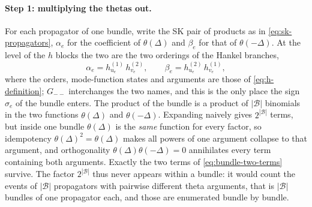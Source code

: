 \documentclass[11pt,a4paper]{article}
\newcommand{\cB}{\mathcal B}
\begin{document}
\paragraph{Step 1: multiplying the thetas out.}
For each propagator of one bundle, write the SK pair of products as in \eqref{eq:sk-propagators},
$\alpha_e$ for the coefficient of $\theta(\Delta)$ and $\beta_e$ for that of $\theta(-\Delta)$. At
the level of the $h$ blocks the two are the two orderings of the Hankel branches,
\begin{equation}
  \alpha_e = h^{(1)}_{u_e}\,h^{(2)}_{v_e},
  \qquad
  \beta_e = h^{(2)}_{u_e}\,h^{(1)}_{v_e},
  \label{eq:bundle-alphabeta}
\end{equation}
where the orders, mode-function states and arguments are those of \eqref{eq:h-definition}; $G_{--}$ interchanges
the two names, and this is the only place the sign $\sigma_e$ of the bundle enters. The product of
the bundle is a product of $|\cB|$ binomials in the two functions $\theta(\Delta)$ and
$\theta(-\Delta)$. Expanding naively gives $2^{|\cB|}$ terms, but inside one bundle $\theta(\Delta)$ is
the \emph{same} function for every factor, so idempotency $\theta(\Delta)^2=\theta(\Delta)$ makes
all powers of one argument collapse to that argument, and orthogonality
$\theta(\Delta)\theta(-\Delta)=0$ annihilates every term containing both arguments. Exactly the two
terms of \eqref{eq:bundle-two-terms} survive. The factor $2^{|\cB|}$ thus never appears within a bundle:
it would count the events of $|\cB|$ propagators with pairwise different theta arguments, that is
$|\cB|$ bundles of one propagator each, and those are enumerated bundle by bundle.
\end{document}
